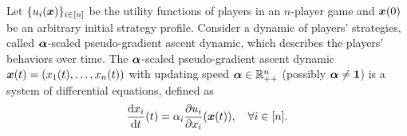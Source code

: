 \begin{definition}
\label{def:BRD}
Let $\{u_i({\bm{x}})\}_{i\in[n]}$ be the utility functions of players in an $n$-player game and ${\bm{x}}(0)$ be an arbitrary initial strategy profile. 
Consider a dynamic of players' strategies, called $\bm{\alpha}$-scaled pseudo-gradient ascent dynamic, which describes the players' behaviors over time.
The $\bm{\alpha}$-scaled pseudo-gradient ascent dynamic
${\bm{x}}(t) = (x_1(t),\dots, x_n(t))$
with updating speed $\bm{\alpha} \in \mathbb{R}_{++}^n$ (possibly $\bm{\alpha} \ne \mathbf{1}$) is a system of differential equations, defined as
\begin{align*}
    \frac{\mathrm{d} x_i}{\mathrm{d} t}(t)
    = \alpha_i \frac{\partial u_i}{\partial x_i}
    ({\bm{x}}(t))
    ,\quad \forall {i\in[n]}.
\end{align*}
    
\end{definition}